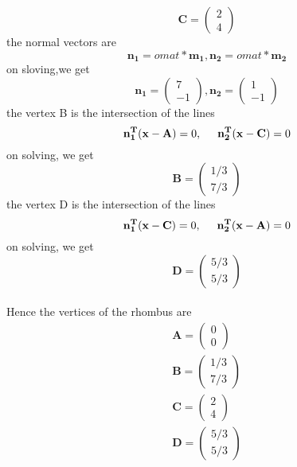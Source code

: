 \documentclass[journal,10pt,twocolumn]{article}
\let\vec\mathbf
\newcommand{\myvec}[1]{\ensuremath{\begin{pmatrix}#1\end{pmatrix}}}
\begin{document}
\begin{equation}
 \vec{C} = \myvec{2\\4}
 \label{eq4}
\end{equation}
the normal vectors are
\begin{equation}
\vec{n_1}=omat*\vec{m_1},
\vec{n_2}=omat*\vec{m_2}
\end{equation}
on sloving,we get
\begin{equation}
\vec{n_1}=\myvec{7\\-1},
\vec{n_2}=\myvec{1\\-1}
\end{equation}
the vertex B is the intersection of the lines 
\begin{equation}
  \vec{n_1^T}(\vec{x}-\vec{A})=0,
   \hspace{5mm}
   \vec{n_2^T}(\vec{x}-\vec{C})=0
\end{equation}
on solving, we get
\begin{equation}
    \vec{B}=\myvec{1/3\\7/3}
\end{equation}
the vertex D is the intersection of the lines 
\begin{equation}
   \vec{n_1^T}(\vec{x}-\vec{C})=0,
   \hspace{5mm}
   \vec{n_2^T}(\vec{x}-\vec{A})=0
\end{equation}
on solving, we get
\begin{equation}
    \vec{D}=\myvec{5/3\\5/3}
\end{equation}\\
 Hence the vertices of the rhombus are
 \begin{eqnarray}
 \vec{A} = \myvec{0\\0}\\
 \vec{B} = \myvec{1/3\\7/3}\\
 \vec{C} = \myvec{2\\4}\\
 \vec{D} = \myvec{5/3\\5/3}
\end{eqnarray}
\end{document}
